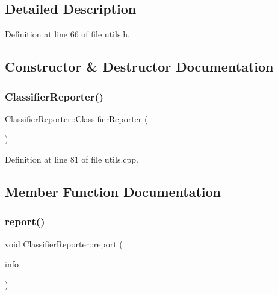 \subsection{Detailed Description}


Definition at line 66 of file utils.\+h.



\subsection{Constructor \& Destructor Documentation}
\mbox{\label{classClassifierReporter_af28cc4673f745cf3b724f98c9b3e7bcf}} 
\subsubsection{\texorpdfstring{Classifier\+Reporter()}{ClassifierReporter()}}
{\footnotesize\ttfamily Classifier\+Reporter\+::\+Classifier\+Reporter (\begin{DoxyParamCaption}{ }\end{DoxyParamCaption})}



Definition at line 81 of file utils.\+cpp.



\subsection{Member Function Documentation}
\mbox{\label{classClassifierReporter_ac6b247b3f9f7f48d0363702f0d82c5d8}} 
\subsubsection{\texorpdfstring{report()}{report()}}
{\footnotesize\ttfamily void Classifier\+Reporter\+::report (\begin{DoxyParamCaption}\item[{const Port\+Info \&}]{info }\end{DoxyParamCaption})}



